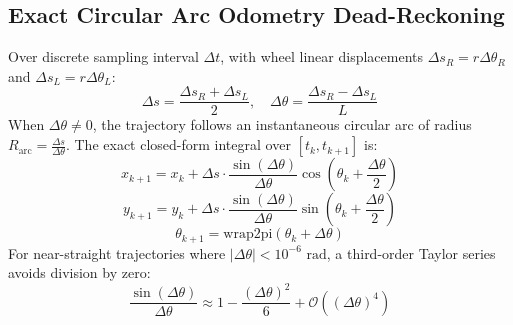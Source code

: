\documentclass[10pt,a4paper]{article}
\begin{document}
\subsection{Exact Circular Arc Odometry Dead-Reckoning}
Over discrete sampling interval $\Delta t$, with wheel linear displacements $\Delta s_R = r \Delta\theta_R$ and $\Delta s_L = r \Delta\theta_L$:
\begin{equation}
\Delta s = \frac{\Delta s_R + \Delta s_L}{2}, \quad \Delta\theta = \frac{\Delta s_R - \Delta s_L}{L}
\end{equation}
When $\Delta\theta \neq 0$, the trajectory follows an instantaneous circular arc of radius $R_{\text{arc}} = \frac{\Delta s}{\Delta\theta}$. The exact closed-form integral over $[t_k, t_{k+1}]$ is:
\begin{equation}
x_{k+1} = x_k + \Delta s \cdot \frac{\sin(\Delta\theta)}{\Delta\theta}\cos\left(\theta_k + \frac{\Delta\theta}{2}\right)
\end{equation}
\begin{equation}
y_{k+1} = y_k + \Delta s \cdot \frac{\sin(\Delta\theta)}{\Delta\theta}\sin\left(\theta_k + \frac{\Delta\theta}{2}\right)
\end{equation}
\begin{equation}
\theta_{k+1} = \text{wrap2pi}(\theta_k + \Delta\theta)
\end{equation}
For near-straight trajectories where $|\Delta\theta| < 10^{-6}\text{ rad}$, a third-order Taylor series avoids division by zero:
\begin{equation}
\frac{\sin(\Delta\theta)}{\Delta\theta} \approx 1 - \frac{(\Delta\theta)^2}{6} + \mathcal{O}((\Delta\theta)^4)
\end{equation}
\end{document}
